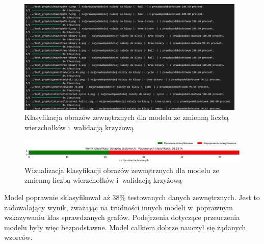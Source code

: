 \begin{figure}[ht]
	\centering
	\includegraphics[height=5.5cm]{resources/tests/images/v3/multiple_edges_crossvalid_txt.png}
	\caption{Klasyfikacja obrazów zewnętrznych dla modelu ze zmienną liczbą wierzchołków i~walidacją krzyżową}
	\label{Fig:tests-csvar-0b}
\end{figure}
\FloatBarrier

\begin{figure}[ht]
	\centering
	\includegraphics[width=14cm]{resources/tests/images/v3/multiple_edges_crossvalid_bar.png}
	\caption{Wizualizacja klasyfikacji obrazów zewnętrznych dla modelu ze zmienną liczbą wierzchołków i~walidacją krzyżową}
	\label{Fig:tests-csvar-0c}
\end{figure}
\FloatBarrier

Model poprawnie sklasyfikował aż 38\% testowanych danych zewnętrznych.
Jest to zadowalający wynik, zważając na trudności innych modeli w~poprawnym wskazywaniu klas sprawdzanych grafów.
Podejrzenia dotyczące przeuczenia modelu były więc bezpodstawne.
Model całkiem dobrze nauczył się żądanych wzorców.

